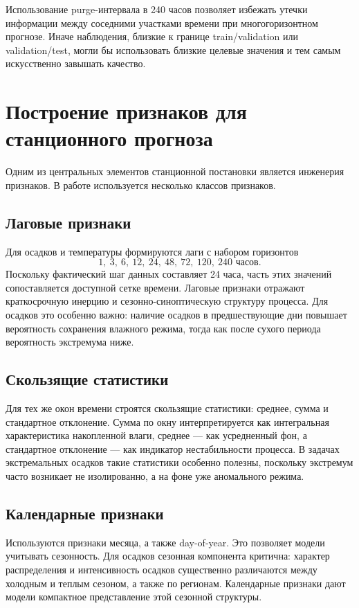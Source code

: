 Использование purge-интервала в 240 часов позволяет избежать утечки информации между соседними участками времени при многогоризонтном прогнозе. Иначе наблюдения, близкие к границе train/validation или validation/test, могли бы использовать близкие целевые значения и тем самым искусственно завышать качество.

\section{Построение признаков для станционного прогноза}

Одним из центральных элементов станционной постановки является инженерия признаков. В работе используется несколько классов признаков.

\subsection{Лаговые признаки}

Для осадков и температуры формируются лаги с набором горизонтов
\[
1,\ 3,\ 6,\ 12,\ 24,\ 48,\ 72,\ 120,\ 240 \text{ часов}.
\]
Поскольку фактический шаг данных составляет 24 часа, часть этих значений сопоставляется доступной сетке времени. Лаговые признаки отражают краткосрочную инерцию и сезонно-синоптическую структуру процесса. Для осадков это особенно важно: наличие осадков в предшествующие дни повышает вероятность сохранения влажного режима, тогда как после сухого периода вероятность экстремума ниже.

\subsection{Скользящие статистики}

Для тех же окон времени строятся скользящие статистики: среднее, сумма и стандартное отклонение. Сумма по окну интерпретируется как интегральная характеристика накопленной влаги, среднее — как усредненный фон, а стандартное отклонение — как индикатор нестабильности процесса. В задачах экстремальных осадков такие статистики особенно полезны, поскольку экстремум часто возникает не изолированно, а на фоне уже аномального режима.

\subsection{Календарные признаки}

Используются признаки месяца, а также day-of-year. Это позволяет модели учитывать сезонность. Для осадков сезонная компонента критична: характер распределения и интенсивность осадков существенно различаются между холодным и теплым сезоном, а также по регионам. Календарные признаки дают модели компактное представление этой сезонной структуры.

